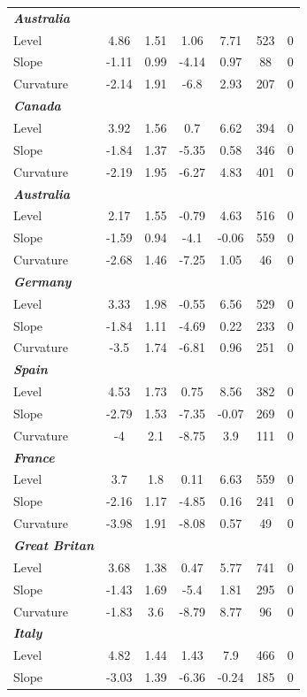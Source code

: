 \documentclass[12pt,bibliography=totoc]{article}
\begin{document}
\begin{table}[H]
\begin{tabular}{l c c c c c c}
\textit{\textbf{Australia}} & & & & & & \\
Level & 4.86 & 1.51 & 1.06 & 7.71 & 523 & 0\\
Slope & -1.11 & 0.99 & -4.14 & 0.97 & 88 & 0\\
Curvature & -2.14 & 1.91 & -6.8 & 2.93 & 207 & 0\\
\textit{\textbf{Canada}} & & & & & & \\
Level & 3.92 & 1.56 & 0.7 & 6.62 & 394 & 0\\
Slope & -1.84 & 1.37 & -5.35 & 0.58 & 346 & 0\\
Curvature & -2.19 & 1.95 & -6.27 & 4.83 & 401 & 0\\
\textit{\textbf{Australia}} & & & & & & \\
Level & 2.17 & 1.55 & -0.79 & 4.63 & 516 & 0\\
Slope & -1.59 & 0.94 & -4.1 & -0.06 & 559 & 0\\
Curvature & -2.68 & 1.46 & -7.25 & 1.05 & 46 & 0\\
\textit{\textbf{Germany}} & & & & & & \\
Level & 3.33 & 1.98 & -0.55 & 6.56 & 529 & 0\\
Slope & -1.84 & 1.11 & -4.69 & 0.22 & 233 & 0\\
Curvature & -3.5 & 1.74 & -6.81 & 0.96 & 251 & 0\\
\textit{\textbf{Spain}} & & & & & & \\
Level & 4.53 & 1.73 & 0.75 & 8.56 & 382 & 0\\
Slope & -2.79 & 1.53 & -7.35 & -0.07 & 269 & 0\\
Curvature & -4 & 2.1 & -8.75 & 3.9 & 111 & 0\\
\textit{\textbf{France}} & & & & & & \\
Level & 3.7 & 1.8 & 0.11 & 6.63 & 559 & 0\\
Slope & -2.16 & 1.17 & -4.85 & 0.16 & 241 & 0\\
Curvature & -3.98 & 1.91 & -8.08 & 0.57 & 49 & 0\\
\textit{\textbf{Great Britan}} & & & & & & \\
Level & 3.68 & 1.38 & 0.47 & 5.77 & 741 & 0\\
Slope & -1.43 & 1.69 & -5.4 & 1.81 & 295 & 0\\
Curvature & -1.83 & 3.6 & -8.79 & 8.77 & 96 & 0\\
\textit{\textbf{Italy}} & & & & & & \\
Level & 4.82 & 1.44 & 1.43 & 7.9 & 466 & 0\\
Slope & -3.03 & 1.39 & -6.36 & -0.24 & 185 & 0\\

\end{tabular}
\end{table}
\end{document}
